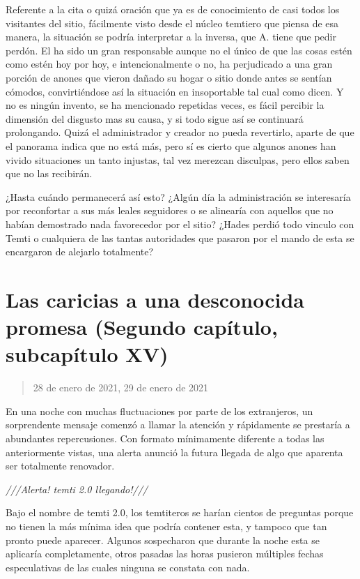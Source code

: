\documentclass[
  spanish,
]{book}
\begin{document}
Referente a la cita o quizá oración que ya es de conocimiento de casi todos los visitantes del sitio, fácilmente visto desde el núcleo temtiero que piensa de esa manera, la situación se podría interpretar a la inversa, que A. tiene que pedir perdón. El ha sido un gran responsable aunque no el único de que las cosas estén como estén hoy por hoy, e intencionalmente o no, ha perjudicado a una gran porción de anones que vieron dañado su hogar o sitio donde antes se sentían cómodos, convirtiéndose así la situación en insoportable tal cual como dicen. Y no es ningún invento, se ha mencionado repetidas veces, es fácil percibir la dimensión del disgusto mas su causa, y si todo sigue así se continuará prolongando. Quizá el administrador y creador no pueda revertirlo, aparte de que el panorama indica que no está más, pero sí es cierto que algunos anones han vivido situaciones un tanto injustas, tal vez merezcan disculpas, pero ellos saben que no las recibirán.

¿Hasta cuándo permanecerá así esto? ¿Algún día la administración se interesaría por reconfortar a sus más leales seguidores o se alinearía con aquellos que no habían demostrado nada favorecedor por el sitio? ¿Hades perdió todo vinculo con Temti o cualquiera de las tantas autoridades que pasaron por el mando de esta se encargaron de alejarlo totalmente?

\hypertarget{las-caricias-a-una-desconocida-promesa-segundo-capuxedtulo-subcapuxedtulo-xv}{%
\section{Las caricias a una desconocida promesa (Segundo capítulo, subcapítulo XV)}\label{las-caricias-a-una-desconocida-promesa-segundo-capuxedtulo-subcapuxedtulo-xv}}

\begin{quote}
28 de enero de 2021, 29 de enero de 2021
\end{quote}

En una noche con muchas fluctuaciones por parte de los extranjeros, un sorprendente mensaje comenzó a llamar la atención y rápidamente se prestaría a abundantes repercusiones. Con formato mínimamente diferente a todas las anteriormente vistas, una alerta anunció la futura llegada de algo que aparenta ser totalmente renovador.

\emph{///Alerta! temti 2.0 llegando!///}

Bajo el nombre de temti 2.0, los temtiteros se harían cientos de preguntas porque no tienen la más mínima idea que podría contener esta, y tampoco que tan pronto puede aparecer. Algunos sospecharon que durante la noche esta se aplicaría completamente, otros pasadas las horas pusieron múltiples fechas especulativas de las cuales ninguna se constata con nada.
\end{document}
